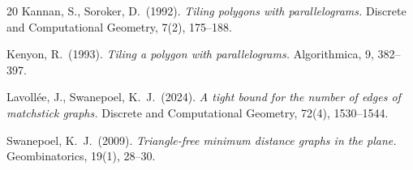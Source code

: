 \documentclass[12pt]{article}
\theoremstyle{plain}
\theoremstyle{definition}
\theoremstyle{remark}
\begin{document}
\begin{thebibliography}{20}
Kannan, S., Soroker, D.\ (1992).
\emph{Tiling polygons with parallelograms.}
Discrete and Computational Geometry, 7(2), 175--188.

Kenyon, R.\ (1993).
\emph{Tiling a polygon with parallelograms.}
Algorithmica, 9, 382--397.


Lavoll\'ee, J., Swanepoel, K.\ J.\ (2024).
\emph{A tight bound for the number of edges of matchstick graphs.}
Discrete and Computational Geometry, 72(4), 1530--1544.


Swanepoel, K.\ J.\ (2009).
\emph{Triangle-free minimum distance graphs in the plane.}
Geombinatorics, 19(1), 28--30.



\end{thebibliography}
\end{document}
